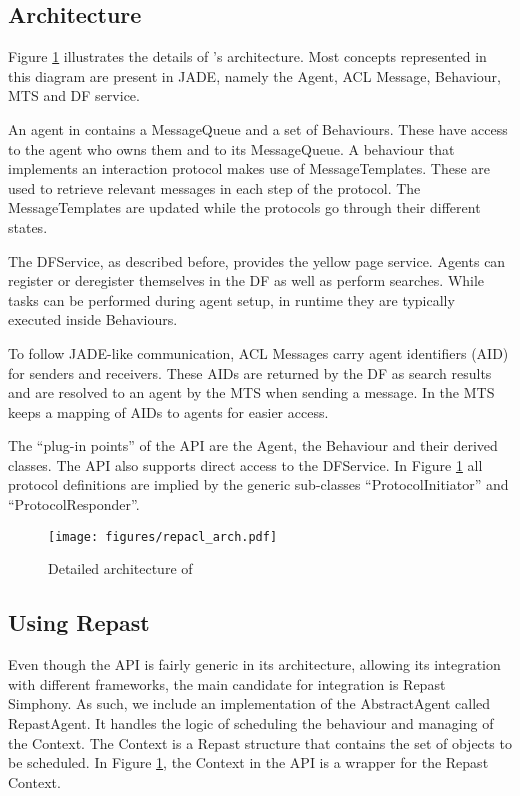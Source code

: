 \subsection{Architecture}

Figure \ref{fig:arch} illustrates the details of \apiname{}'s architecture. Most concepts represented in this diagram are present in JADE, namely the Agent, ACL Message, Behaviour, MTS and DF service.

An agent in \apiname{} contains a MessageQueue and a set of Behaviours. These have access to the agent who owns them and to its MessageQueue. A behaviour that implements an interaction protocol makes use of MessageTemplates. These are used to retrieve relevant messages in each step of the protocol. The MessageTemplates are updated while the protocols go through their different states.

The DFService, as described before, provides the yellow page service. Agents can register or deregister themselves in the DF as well as perform searches. While tasks can be performed during agent setup, in runtime they are typically executed inside Behaviours.

To follow JADE-like communication, ACL Messages carry agent identifiers (AID) for senders and receivers. These AIDs are returned by the DF as search results and are resolved to an agent by the MTS when sending a message. In \apiname{} the MTS keeps a mapping of AIDs to agents for easier access.

The ``plug-in points'' of the API are the Agent, the Behaviour and their derived classes. The API also supports direct access to the DFService. In Figure \ref{fig:arch} all protocol definitions are implied by the generic sub-classes ``ProtocolInitiator'' and ``ProtocolResponder''. 

\begin{figure}[h]
	\centering
	\texttt{[image: figures/repacl\_arch.pdf]}
	\caption{Detailed architecture of \apiname{}}
	\label{fig:arch}
\end{figure}

\subsection{Using Repast}

Even though the API is fairly generic in its architecture, allowing its integration with different frameworks, the main candidate for integration is Repast Simphony. As such, we include an implementation of the AbstractAgent called RepastAgent. It handles the logic of scheduling the behaviour and managing of the Context. The Context is a Repast structure that contains the set of objects to be scheduled. In Figure \ref{fig:arch}, the Context in the API is a wrapper for the Repast Context.


